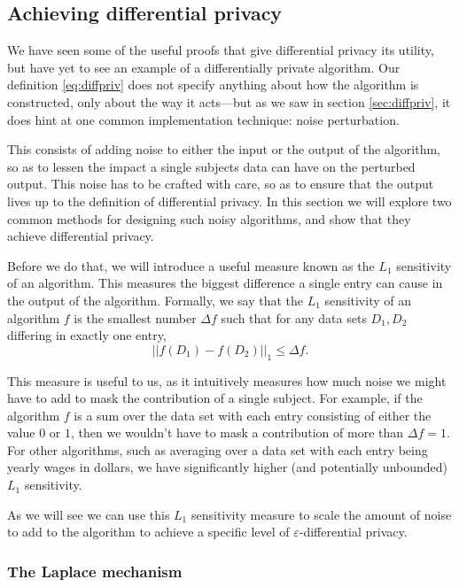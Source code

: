 \documentclass[12pt]{article}
\renewcommand{\epsilon}{\varepsilon}
\begin{document}
\subsection{Achieving differential privacy \label{sec:achieving}}

We have seen some of the useful proofs that give differential privacy its utility, but have yet to see an example of a differentially private algorithm. Our definition \ref{eq:diffpriv} does not specify anything about how the algorithm is constructed, only about the way it acts---but as we saw in section \ref{sec:diffpriv}, it does hint at one common implementation technique: noise perturbation.

This consists of adding noise to either the input or the output of the algorithm, so as to lessen the impact a single subjects data can have on the perturbed output. This noise has to be crafted with care, so as to ensure that the output lives up to the definition of differential privacy. In this section we will explore two common methods for designing such noisy algorithms, and show that they achieve differential privacy. \bigskip

Before we do that, we will introduce a useful measure known as the $L_1$ sensitivity of an algorithm. This measures the biggest difference a single entry can cause in the output of the algorithm. Formally, we say that the $L_1$ sensitivity of an algorithm $f$ is the smallest number $\Delta f$ such that for any data sets $D_1,D_2$ differing in exactly one entry,
\begin{equation}\label{eq:L1_sensitivity}
    ||f(D_1)-f(D_2)||_1 \leq \Delta f.
\end{equation}

This measure is useful to us, as it intuitively measures how much noise we might have to add to mask the contribution of a single subject. For example, if the algorithm $f$ is a sum over the data set with each entry consisting of either the value $0$ or $1$, then we wouldn't have to mask a contribution of more than $\Delta f = 1$. For other algorithms, such as averaging over a data set with each entry being yearly wages in dollars, we have significantly higher (and potentially unbounded) $L_1$ sensitivity.

As we will see we can use this $L_1$ sensitivity measure to scale the amount of noise to add to the algorithm to achieve a specific level of $\epsilon$-differential privacy.

\subsubsection{The Laplace mechanism}
\end{document}
